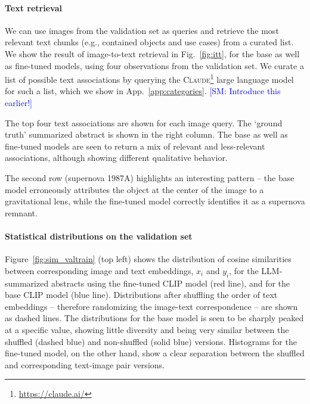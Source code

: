 \documentclass[10pt]{article} %
\newcommand{\SM}[1]{\textcolor{blue}{[SM: #1]}}
\begin{document}
\paragraph*{Text retrieval}

We can use images from the validation set as queries and retrieve the most relevant text chunks (e.g., contained objects and use cases) from a curated list.
%
We show the result of image-to-text retrieval in Fig.~\ref{fig:itt}, for the base as well as fine-tuned models, using four observations from the validation set.
%
We curate a list of possible text associations by querying the \textsc{Claude}\footnote{\url{https://claude.ai/}} large language model for such a list, which we show in App.~\ref{app:categories}. \SM{Introduce this earlier!}

The top four text associations are shown for each image query.
%
The `ground truth' summarized abstract is shown in the right column.
%
The base as well as fine-tuned models are seen to return a mix of relevant and less-relevant associations, although showing different qualitative behavior.
%

The second row (supernova 1987A) highlights an interesting pattern -- the base model erroneously attributes the object at the center of the image to a gravitational lens, while the fine-tuned model correctly identifies it as a supernova remnant.

\paragraph*{Statistical distributions on the validation set}

Figure~\ref{fig:sim_valtrain} (top left) shows the distribution of cosine similarities between corresponding image and text embeddings, $x_i$ and $y_i$, for the LLM-summarized abstracts using the fine-tuned CLIP model (red line), and for the base CLIP model (blue line).
%
Distributions after shuffling the order of text embeddings -- therefore randomizing the image-text correspondence -- are shown as dashed lines.
%
The distributions for the base model is seen to be sharply peaked at a specific value, showing little diversity and being very similar between the shuffled (dashed blue) and non-shuffled (solid blue) versions.
%
Histograms for the fine-tuned model, on the other hand, show a clear separation between the shuffled and corresponding text-image pair versions.
\end{document}
